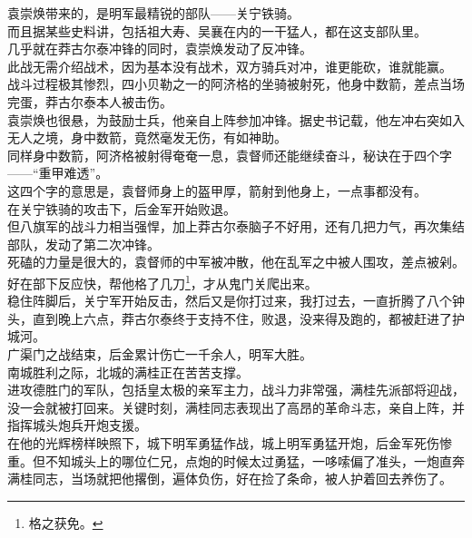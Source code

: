 \begin{multicols}{\theparacolNo}
袁崇焕带来的，是明军最精锐的部队——关宁铁骑。\\

而且据某些史料讲，包括祖大寿、吴襄在内的一干猛人，都在这支部队里。\\

几乎就在莽古尔泰冲锋的同时，袁崇焕发动了反冲锋。\\

此战无需介绍战术，因为基本没有战术，双方骑兵对冲，谁更能砍，谁就能赢。\\

战斗过程极其惨烈，四小贝勒之一的阿济格的坐骑被射死，他身中数箭，差点当场完蛋，莽古尔泰本人被击伤。\\

袁崇焕也很悬，为鼓励士兵，他亲自上阵参加冲锋。据史书记载，他左冲右突如入无人之境，身中数箭，竟然毫发无伤，有如神助。\\

同样身中数箭，阿济格被射得奄奄一息，袁督师还能继续奋斗，秘诀在于四个字——“重甲难透”。\\

这四个字的意思是，袁督师身上的盔甲厚，箭射到他身上，一点事都没有。\\

在关宁铁骑的攻击下，后金军开始败退。\\

但八旗军的战斗力相当强悍，加上莽古尔泰脑子不好用，还有几把力气，再次集结部队，发动了第二次冲锋。\\

死磕的力量是很大的，袁督师的中军被冲散，他在乱军之中被人围攻，差点被剁。好在部下反应快，帮他格了几刀\footnote{格之获免。}，才从鬼门关爬出来。\\

稳住阵脚后，关宁军开始反击，然后又是你打过来，我打过去，一直折腾了八个钟头，直到晚上六点，莽古尔泰终于支持不住，败退，没来得及跑的，都被赶进了护城河。\\

广渠门之战结束，后金累计伤亡一千余人，明军大胜。\\

南城胜利之际，北城的满桂正在苦苦支撑。\\

进攻德胜门的军队，包括皇太极的亲军主力，战斗力非常强，满桂先派部将迎战，没一会就被打回来。关键时刻，满桂同志表现出了高昂的革命斗志，亲自上阵，并指挥城头炮兵开炮支援。\\

在他的光辉榜样映照下，城下明军勇猛作战，城上明军勇猛开炮，后金军死伤惨重。但不知城头上的哪位仁兄，点炮的时候太过勇猛，一哆嗦偏了准头，一炮直奔满桂同志，当场就把他撂倒，遍体负伤，好在捡了条命，被人护着回去养伤了。\\


\end{multicols}
